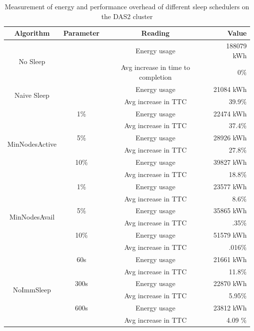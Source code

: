 \begin{table}
    \centering
    \begin{tabular}{|c|c|c|r|}
        \hline
        Algorithm & Parameter & Reading & Value \\
        \hline
        \multirow{2}{*}{No Sleep} &  & Energy usage & 188079 kWh\\\cline{3-4}
        & & Avg increase in time to completion & 0\%\\
        \hline
        \multirow{2}{*}{Naive Sleep} & & Energy usage & 21084 kWh\\\cline{3-4}
        & & Avg increase in TTC & 39.9\%\\
        \hline
        \multirow{6}{*}{MinNodesActive} & 1\% & Energy usage & 22474 kWh\\\cline{3-4}
        & & Avg increase in TTC & 37.4\%\\\cline{2-4}
        
        & 5\% & Energy usage & 28926 kWh\\\cline{3-4}
        & & Avg increase in TTC & 27.8\%\\\cline{2-4}
        
        & 10\% & Energy usage & 39827 kWh\\\cline{3-4}
        & & Avg increase in TTC & 18.8\%\\\cline{2-4}
        \hline
        
        \multirow{6}{*}{MinNodesAvail} & 1\% & Energy usage & 23577 kWh\\\cline{3-4}
        & & Avg increase in TTC & 8.6\%\\\cline{2-4}
        
        & 5\% & Energy usage & 35865 kWh\\\cline{3-4}
        & & Avg increase in TTC & .35\%\\\cline{2-4}
        
        & 10\% & Energy usage & 51579 kWh\\\cline{3-4}
        & & Avg increase in TTC & .016\%\\\cline{2-4}
        \hline
        
        \multirow{6}{*}{NoImmSleep} & 60s & Energy usage & 21661 kWh\\\cline{3-4}
        & & Avg increase in TTC & 11.8\%\\\cline{2-4}
        
        & 300s & Energy usage & 22870 kWh\\\cline{3-4}
        & & Avg increase in TTC & 5.95\%\\\cline{2-4}
        
        & 600s & Energy usage & 23812 kWh\\\cline{3-4}
        & & Avg increase in TTC & 4.09  \%\\\cline{2-4}
        \hline
    \end{tabular}
    \caption{Measurement of energy and performance overhead of different sleep schedulers on the DAS2 cluster}
    \label{tab:sleep-overhead}
\end{table}

